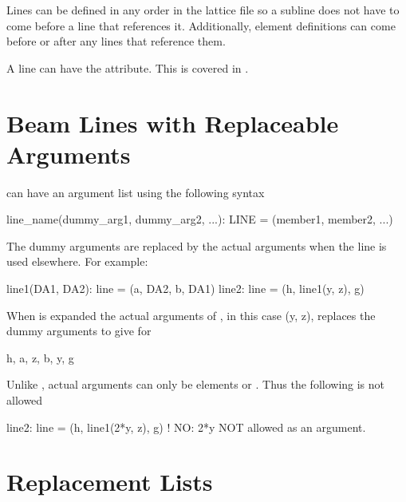 Lines can be defined in any order in the lattice file so a subline
does not have to come before a line that references it. Additionally,
element definitions can come before or after any lines that reference
them.

A line can have the  attribute. This is covered in
.

\section{Beam Lines with Replaceable Arguments}

 can have an argument list using the following syntax
\begin{example}
  line_name(dummy_arg1, dummy_arg2, ...): LINE = (member1, member2, ...)
\end{example}
The dummy arguments are replaced by the actual arguments when the line is used
elsewhere. For example:
\begin{example}
  line1(DA1, DA2): line = (a, DA2, b, DA1)
  line2: line = (h, line1(y, z), g)
\end{example}
When  is expanded the actual arguments of , in this
case \vn(y, z), replaces the dummy arguments  to give for
\begin{example}
  h, a, z, b, y, g
\end{example} 
Unlike \mad,  actual arguments can only be elements or . 
Thus the following is not allowed
\begin{example}
  line2: line = (h, line1(2*y, z), g)   ! NO: 2*y NOT allowed as an argument.
\end{example}

\section{Replacement Lists}

